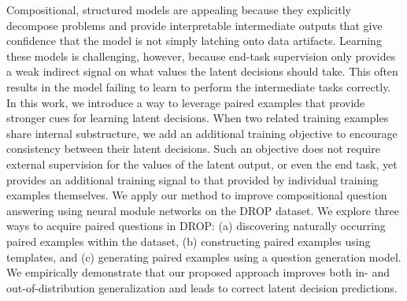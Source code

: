 Compositional, structured models are appealing because they explicitly decompose problems and provide interpretable intermediate outputs that give confidence that the model is not simply latching onto data artifacts. Learning these models is challenging, however, because end-task supervision only provides a weak indirect signal on what values the latent decisions should take. This often results in the model failing to learn to perform the intermediate tasks correctly. In this work, we introduce a way to leverage paired examples that provide stronger cues for learning latent decisions. When two related training examples share internal substructure, we add an additional training objective to encourage consistency between their latent decisions. Such an objective does not require external supervision for the values of the latent output, or even the end task, yet provides an additional training signal to that provided by individual training examples themselves. We apply our method to improve compositional question answering using neural module networks on the DROP dataset. We explore three ways to acquire paired questions in DROP: (a) discovering naturally occurring paired examples within the dataset, (b) constructing paired examples using templates, and (c) generating paired examples using a question generation model. We empirically demonstrate that our proposed approach improves both in- and out-of-distribution generalization and leads to correct latent decision predictions.
